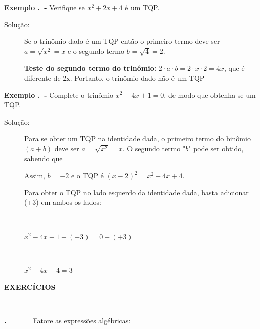 \noindent\textbf{Exemplo \thesubsection.\theexemplo~-} Verifique se $x^2 + 2x + 4$ é um TQP.

\begin{description}
\item [Solução:] Se o trinômio dado é um TQP então o primeiro termo deve ser $a = \sqrt{x^2} = x$ e o segundo termo $b = \sqrt{4} = 2$.

\textbf{Teste do segundo termo do trinômio:}  $2 \cdot a \cdot b = 2 \cdot x \cdot 2 = 4x$, que é diferente de 2x. Portanto, o trinômio dado não é um TQP \qedsymbol{}

\end{description}

\noindent\textbf{Exemplo \thesubsection.\theexemplo~-} Complete o trinômio $x^2 - 4x + 1 = 0$, de modo que obtenha-se um TQP.

\begin{description}
\item [Solução:] Para se obter um TQP na identidade dada, o primeiro termo do binômio $(a+b)$ deve ser $a=\sqrt{x^2}=x$. O segundo termo "$b$" pode ser obtido, sabendo que


Assim, $b = -2$ e o TQP é $(x-2)^2 = x^2 - 4x + 4$.

Para obter o TQP no lado esquerdo da identidade dada, basta adicionar (+3) em ambos os lados:

~~

$x^2 - 4x +1 +(+3) = 0 +(+3)$

~

$x^2 -4x + 4  = 3$ \qedsymbol{}

\end{description}

\textbf{EXERCÍCIOS \thesubsection}

~~

\textbf{\thesubsection.\theexercicio ~~~~~~} Fatore as expressões algébricas:


